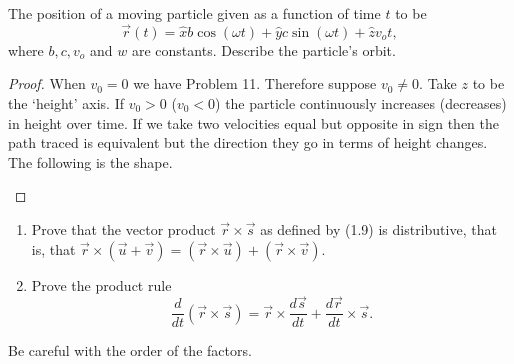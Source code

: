 \begin{tcolorbox}[title=Problem 12, breakable]
    The position of a moving particle given as a function of time $t$ to be 
    \[\vec{r}(t) = \hat{x} b \cos(\omega t) + \hat{y} c \sin (\omega t) + \hat{z} v_o t,\]
    where $b, c, v_o$ and $w$ are constants. Describe the particle's orbit.
\end{tcolorbox}

\begin{proof}
    When $v_0 = 0$ we have Problem 11.
    Therefore suppose $v_0 \ne 0$.
    Take $z$ to be the `height' axis.
    If $v_0 > 0$ ($v_0 < 0$) the particle continuously increases (decreases) in height over time.
    If we take two velocities equal but opposite in sign then the path traced is equivalent 
    but the direction they go in terms of height changes.
    The following is the shape.
    \begin{center}
    \end{center}
\end{proof}


\begin{tcolorbox}[title=Problem 17, breakable]
    \begin{enumerate}
        \item Prove that the vector product $\vec{r} \times \vec{s}$ as defined by (1.9)
        is distributive, that is, that $\vec{r} \times (\vec{u} + \vec{v}) = (\vec{r} \times \vec{u}) + (\vec{r} \times \vec{v})$.
        \item Prove the product rule 
        \[\frac{d}{dt} (\vec{r} \times \vec{s}) = \vec{r} \times \frac{d \vec{s}}{dt} + \frac{d \vec{r}}{dt} \times \vec{s}.\]
    \end{enumerate}
    Be careful with the order of the factors.
\end{tcolorbox}

